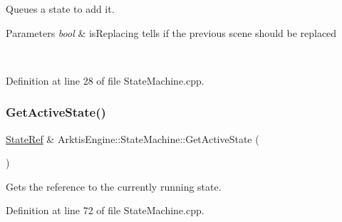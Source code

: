 Queues a state to add it. 


\begin{DoxyParams}{Parameters}
{\em bool} & is\+Replacing tells if the previous scene should be replaced \begin{DoxyVerb}\end{DoxyVerb}
 \\
\hline
\end{DoxyParams}


Definition at line 28 of file State\+Machine.\+cpp.


\begin{DoxyCode}{0}

\end{DoxyCode}
\mbox{\label{class_arktis_engine_1_1_state_machine_adc32ec7490b802e3600dde4d9f793fb1}} 
\subsubsection{\texorpdfstring{GetActiveState()}{GetActiveState()}}
{\footnotesize\ttfamily \mbox{\hyperlink{namespace_arktis_engine_a2df871316f5a55f656d888e1ab2f4531}{State\+Ref}} \& Arktis\+Engine\+::\+State\+Machine\+::\+Get\+Active\+State (\begin{DoxyParamCaption}{ }\end{DoxyParamCaption})}



Gets the reference to the currently running state. 

\begin{DoxyVerb}\end{DoxyVerb}
 

Definition at line 72 of file State\+Machine.\+cpp.


\begin{DoxyCode}{0}

\end{DoxyCode}
\mbox{\label{class_arktis_engine_1_1_state_machine_a49929447f3475376c8073daea61442e7}} 
